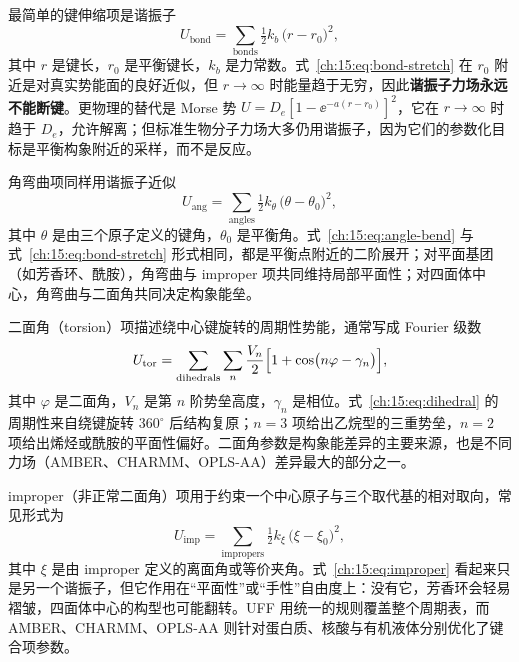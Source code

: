 最简单的键伸缩项是谐振子
\begin{equation}
U_{\mathrm{bond}}
= \sum_{\mathrm{bonds}} \tfrac12 k_b\,\bigl(r-r_0\bigr)^2,
\label{ch:15:eq:bond-stretch}
\end{equation}
其中 $r$ 是键长，$r_0$ 是平衡键长，$k_b$ 是力常数。式~\eqref{ch:15:eq:bond-stretch} 在 $r_0$ 附近是对真实势能面的良好近似，但 $r\to\infty$ 时能量趋于无穷，因此\textbf{谐振子力场永远不能断键}。更物理的替代是 Morse 势
$U=D_e[1-\ee^{-a(r-r_0)}]^2$，它在 $r\to\infty$ 时趋于 $D_e$，允许解离；但标准生物分子力场大多仍用谐振子，因为它们的参数化目标是平衡构象附近的采样，而不是反应。

角弯曲项同样用谐振子近似
\begin{equation}
U_{\mathrm{ang}}
= \sum_{\mathrm{angles}} \tfrac12 k_\theta\,\bigl(\theta-\theta_0\bigr)^2,
\label{ch:15:eq:angle-bend}
\end{equation}
其中 $\theta$ 是由三个原子定义的键角，$\theta_0$ 是平衡角。式~\eqref{ch:15:eq:angle-bend} 与式~\eqref{ch:15:eq:bond-stretch} 形式相同，都是平衡点附近的二阶展开；对平面基团（如芳香环、酰胺），角弯曲与 improper 项共同维持局部平面性；对四面体中心，角弯曲与二面角共同决定构象能垒。

二面角（torsion）项描述绕中心键旋转的周期性势能，通常写成 Fourier 级数
\begin{equation}
U_{\mathrm{tor}}
= \sum_{\mathrm{dihedrals}}\sum_{n}
\frac{V_n}{2}\Bigl[1+\cos\bigl(n\varphi-\gamma_n\bigr)\Bigr],
\label{ch:15:eq:dihedral}
\end{equation}
其中 $\varphi$ 是二面角，$V_n$ 是第 $n$ 阶势垒高度，$\gamma_n$ 是相位。式~\eqref{ch:15:eq:dihedral} 的周期性来自绕键旋转 $360^\circ$ 后结构复原；$n=3$ 项给出乙烷型的三重势垒，$n=2$ 项给出烯烃或酰胺的平面性偏好。二面角参数是构象能差异的主要来源，也是不同力场（AMBER、CHARMM、OPLS-AA）差异最大的部分之一\citep{cornell1995amber,mackerell1998charmm,jorgensen1996oplsaa}。

improper（非正常二面角）项用于约束一个中心原子与三个取代基的相对取向，常见形式为
\begin{equation}
U_{\mathrm{imp}}
= \sum_{\mathrm{impropers}} \tfrac12 k_\xi\,\bigl(\xi-\xi_0\bigr)^2,
\label{ch:15:eq:improper}
\end{equation}
其中 $\xi$ 是由 improper 定义的离面角或等价夹角。式~\eqref{ch:15:eq:improper} 看起来只是另一个谐振子，但它作用在“平面性”或“手性”自由度上：没有它，芳香环会轻易褶皱，四面体中心的构型也可能翻转。UFF 用统一的规则覆盖整个周期表\citep{rappe1992uff}，而 AMBER、CHARMM、OPLS-AA 则针对蛋白质、核酸与有机液体分别优化了键合项参数\citep{cornell1995amber,mackerell1998charmm,jorgensen1996oplsaa}。

